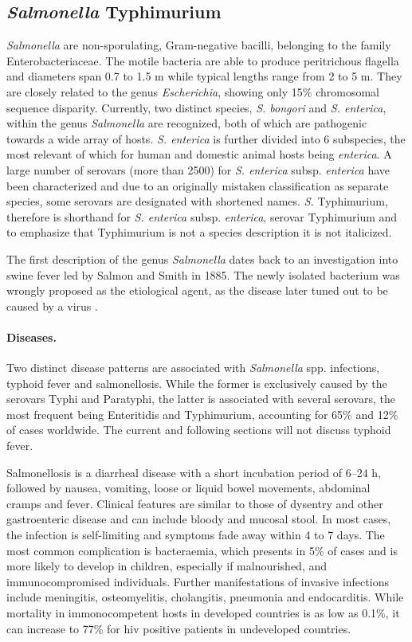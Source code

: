 \subsection{\textit{Salmonella} Typhimurium}
\textit{Salmonella} are non-sporulating, Gram-negative bacilli, belonging to the family Enterobacteriaceae. The motile bacteria are able to produce peritrichous flagella and diameters span 0.7 to 1.5 \textmu m while typical lengths range from 2 to 5 \textmu m. They are closely related to the genus \textit{Escherichia}, showing only 15\% chromosomal sequence disparity. Currently, two distinct species, \textit{S. bongori} and \textit{S. enterica}, within the genus \textit{Salmonella} are recognized, both of which are pathogenic towards a wide array of hosts. \textit{S. enterica} is further divided into 6 subspecies, the most relevant of which for human and domestic animal hosts being \textit{enterica}. A large number of serovars (more than 2500) for \textit{S. enterica} subsp. \textit{enterica} have been characterized and due to an originally mistaken classification as separate species, some serovars are designated with shortened names. \textit{S.} Typhimurium, therefore is shorthand for \textit{S. enterica} subsp. \textit{enterica}, serovar Typhimurium and to emphasize that Typhimurium is not a species description it is not italicized.

The first description of the genus \textit{Salmonella} dates back to an investigation into swine fever led by Salmon and Smith in 1885. The newly isolated bacterium was wrongly proposed as the etiological agent, as the disease later tuned out to be caused by a virus \citep{Fabrega2013}.

\paragraph{Diseases.}
Two distinct disease patterns are associated with \textit{Salmonella} spp. infections, typhoid fever and salmonellosis. While the former is exclusively caused by the serovars Typhi and Paratyphi, the latter is associated with several serovars, the most frequent being Enteritidis and Typhimurium, accounting for 65\% and 12\% of cases worldwide. The current and following sections will not discuss typhoid fever.

Salmonellosis is a diarrheal disease with a short incubation period of 6--24 h, followed by nausea, vomiting, loose or liquid bowel movements, abdominal cramps and fever. Clinical features are similar to those of dysentry and other gastroenteric disease and can include bloody and mucosal stool. In most cases, the infection is self-limiting and symptoms fade away within 4 to 7 days. The most common complication is bacteraemia, which presents in 5\% of cases and is more likely to develop in children, especially if malnourished, and immunocompromised individuals. Further manifestations of invasive infections include meningitis, osteomyelitis, cholangitis, pneumonia and endocarditis. While mortality in immonocompetent hosts in developed countries is as low as 0.1\%, it can increase to 77\% for \gls{hiv} positive patients in undeveloped countries.

